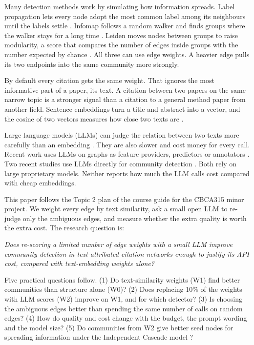 \documentclass[journal]{IEEEtran}
\begin{document}
Many detection methods work by simulating how information spreads. Label propagation lets every node adopt the most common label among its neighbours until the labels settle \cite{raghavan2007}. Infomap follows a random walker and finds groups where the walker stays for a long time \cite{rosvall2008}. Leiden moves nodes between groups to raise modularity, a score that compares the number of edges inside groups with the number expected by chance \cite{traag2019}. All three can use edge weights. A heavier edge pulls its two endpoints into the same community more strongly.

By default every citation gets the same weight. That ignores the most informative part of a paper, its text. A citation between two papers on the same narrow topic is a stronger signal than a citation to a general method paper from another field. Sentence embeddings turn a title and abstract into a vector, and the cosine of two vectors measures how close two texts are \cite{reimers2019}.

Large language models (LLMs) can judge the relation between two texts more carefully than an embedding \cite{jin2024,chen2024explor}. They are also slower and cost money for every call. Recent work uses LLMs on graphs as feature providers, predictors or annotators \cite{jin2024,chen2024explor,he2024,chen2024llmgnn,li2024}. Two recent studies use LLMs directly for community detection \cite{ni2026,gujral2025}. Both rely on large proprietary models. Neither reports how much the LLM calls cost compared with cheap embeddings.

This paper follows the Topic 2 plan of the course guide for the CBCA315 minor project. We weight every edge by text similarity, ask a small open LLM to re-judge only the ambiguous edges, and measure whether the extra quality is worth the extra cost. The research question is:

\emph{Does re-scoring a limited number of edge weights with a small LLM improve community detection in text-attributed citation networks enough to justify its API cost, compared with text-embedding weights alone?}

Five practical questions follow. (1) Do text-similarity weights (W1) find better communities than structure alone (W0)? (2) Does replacing 10\% of the weights with LLM scores (W2) improve on W1, and for which detector? (3) Is choosing the ambiguous edges better than spending the same number of calls on random edges? (4) How do quality and cost change with the budget, the prompt wording and the model size? (5) Do communities from W2 give better seed nodes for spreading information under the Independent Cascade model \cite{kempe2003}?
\end{document}
